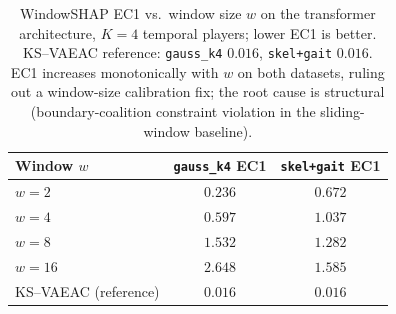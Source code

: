 \begin{table}[h]
\centering\small
\caption{WindowSHAP EC1 vs.\ window size $w$ on the transformer architecture,
$K{=}4$ temporal players; lower EC1 is better.
KS--VAEAC reference: \texttt{gauss\_k4} $0.016$, \texttt{skel+gait} $0.016$.
EC1 increases monotonically with $w$ on both datasets, ruling out a
window-size calibration fix; the root cause is structural (boundary-coalition
constraint violation in the sliding-window baseline).}
\label{tab:winshap_diag}
\begin{tabular}{lcc}
\toprule
Window $w$ & \texttt{gauss\_k4} EC1 & \texttt{skel+gait} EC1 \\
\midrule
$w=2$  & $0.236$ & $0.672$ \\
$w=4$  & $0.597$ & $1.037$ \\
$w=8$  & $1.532$ & $1.282$ \\
$w=16$ & $2.648$ & $1.585$ \\
\midrule
KS--VAEAC (reference) & $0.016$ & $0.016$ \\
\bottomrule
\end{tabular}
\end{table}
